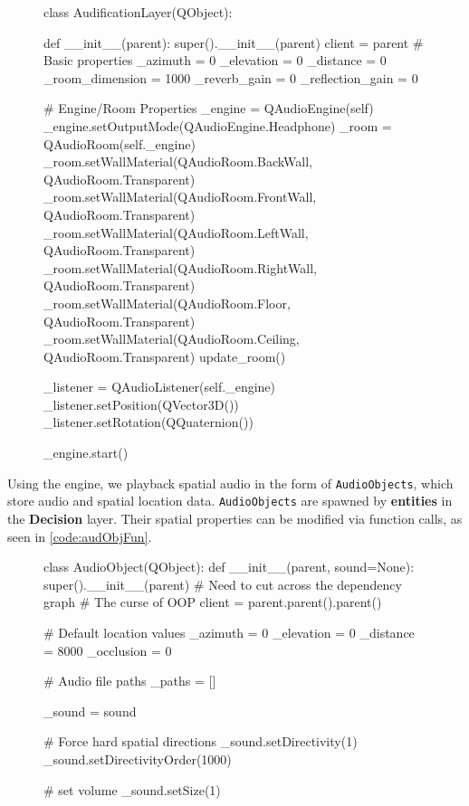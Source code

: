\documentclass{report}
\newcommand{\state}[1]{\textbf{#1}}
\newcommand{\decision}{\textbf{Decision}\xspace}
\newcommand{\audio}{\textbf{Audification}\xspace}
\begin{document}
\begin{figure}
    \centering
    \begin{codeblock}
class AudificationLayer(QObject):

    def __init__(parent):
        super().__init__(parent)
        client = parent
        # Basic properties
        _azimuth = 0
        _elevation = 0
        _distance = 0
        _room_dimension = 1000
        _reverb_gain = 0
        _reflection_gain = 0

        # Engine/Room Properties
        _engine = QAudioEngine(self)
        _engine.setOutputMode(QAudioEngine.Headphone)
        _room = QAudioRoom(self._engine)
        _room.setWallMaterial(QAudioRoom.BackWall, QAudioRoom.Transparent)
        _room.setWallMaterial(QAudioRoom.FrontWall, QAudioRoom.Transparent)
        _room.setWallMaterial(QAudioRoom.LeftWall, QAudioRoom.Transparent)
        _room.setWallMaterial(QAudioRoom.RightWall, QAudioRoom.Transparent)
        _room.setWallMaterial(QAudioRoom.Floor, QAudioRoom.Transparent)
        _room.setWallMaterial(QAudioRoom.Ceiling, QAudioRoom.Transparent)
        update_room()

        _listener = QAudioListener(self._engine)
        _listener.setPosition(QVector3D())
        _listener.setRotation(QQuaternion())

        _engine.start()

\end{codeblock}
    \captionof{code}{The \audio engine}
    \label{code:audEng}
\end{figure}

Using the engine, we playback spatial audio in the form of \texttt{AudioObjects}, which store audio and spatial location data. \texttt{AudioObjects} are spawned by \state{entities} in the \decision layer. Their spatial properties can be modified via function calls, as seen in \cref{code:audObjFun}.

\begin{figure}
    \centering
    \begin{codeblock}
class AudioObject(QObject):
    def __init__(parent, sound=None):
        super().__init__(parent)
        # Need to cut across the dependency graph
        # The curse of OOP
        client = parent.parent().parent()

        # Default location values
        _azimuth = 0
        _elevation = 0
        _distance = 8000
        _occlusion = 0

        # Audio file paths
        _paths = []
        
        _sound = sound
        
        # Force hard spatial directions
        _sound.setDirectivity(1)
        _sound.setDirectivityOrder(1000)
        
        # set volume
        _sound.setSize(1)
\end{codeblock}
    \label{code:audObj}
\end{figure}
\end{document}
